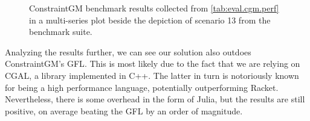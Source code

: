 \begin{figure}[htb]
  \begin{subfigure}[t]{.6\linewidth}
    \centering
    \label{fig:eval.cgm.perf.plot}
  \end{subfigure}
  \hfill
  \begin{subfigure}[t]{.35\linewidth}
    \label{fig:eval.cgm.perf.13}
  \end{subfigure}
  \caption[ConstraintGM benchmarks and Scenario 13]{\label{fig:eval.cgm.perf}%
    ConstraintGM benchmark results collected from \cref{tab:eval.cgm.perf} in a
    multi-series plot  beside the depiction of
    scenario 13  from the benchmark suite.}
\end{figure}

Analyzing the results further, we can see our solution also outdoes
ConstraintGM's \ac{GFL}.  This is most likely due to the fact that we are
relying on \ac{CGAL}, a library implemented in C++.  The latter in turn is
notoriously known for being a high performance language, potentially
outperforming Racket.  Nevertheless, there is some overhead in the form of
Julia, but the results are still positive, on average beating the \ac{GFL} by an
order of magnitude.

